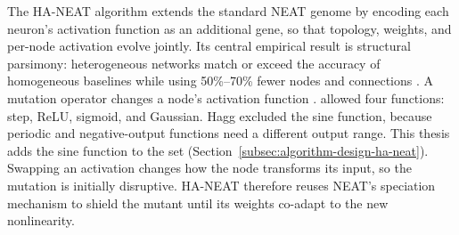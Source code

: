 



The HA-NEAT algorithm \parencite{hagg_evolving_2017} extends the standard NEAT genome by encoding each neuron's activation function as an additional gene, so that topology, weights, and per-node activation evolve jointly.
Its central empirical result is structural parsimony: heterogeneous networks match or exceed the accuracy of homogeneous baselines while using 50\%--70\% fewer nodes and connections \parencite{hagg_evolving_2017}.
A mutation operator changes a node's activation function . \textcite{hagg_evolving_2017} allowed four functions: step, ReLU, sigmoid, and Gaussian. Hagg excluded the sine function, because periodic and negative-output functions need a different output range. This thesis adds the sine function to the set (Section~\ref{subsec:algorithm-design-ha-neat}).
Swapping an activation changes how the node transforms its input, so the mutation is initially disruptive.
HA-NEAT therefore reuses NEAT's speciation mechanism to shield the mutant until its weights co-adapt to the new nonlinearity.

